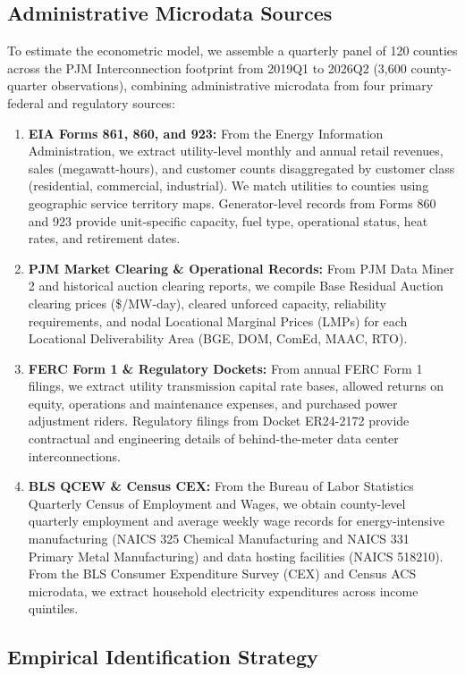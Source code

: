 \documentclass[11pt,a4paper]{article}
\begin{document}
\subsection{Administrative Microdata Sources}

To estimate the econometric model, we assemble a quarterly panel of 120 counties across the PJM Interconnection footprint from 2019Q1 to 2026Q2 (3,600 county-quarter observations), combining administrative microdata from four primary federal and regulatory sources:
\begin{enumerate}
    \item \textbf{EIA Forms 861, 860, and 923:} From the Energy Information Administration, we extract utility-level monthly and annual retail revenues, sales (megawatt-hours), and customer counts disaggregated by customer class (residential, commercial, industrial). We match utilities to counties using geographic service territory maps. Generator-level records from Forms 860 and 923 provide unit-specific capacity, fuel type, operational status, heat rates, and retirement dates.
    \item \textbf{PJM Market Clearing \& Operational Records:} From PJM Data Miner 2 and historical auction clearing reports, we compile Base Residual Auction clearing prices (\$/MW-day), cleared unforced capacity, reliability requirements, and nodal Locational Marginal Prices (LMPs) for each Locational Deliverability Area (BGE, DOM, ComEd, MAAC, RTO).
    \item \textbf{FERC Form 1 \& Regulatory Dockets:} From annual FERC Form 1 filings, we extract utility transmission capital rate bases, allowed returns on equity, operations and maintenance expenses, and purchased power adjustment riders. Regulatory filings from Docket ER24-2172 provide contractual and engineering details of behind-the-meter data center interconnections.
    \item \textbf{BLS QCEW \& Census CEX:} From the Bureau of Labor Statistics Quarterly Census of Employment and Wages, we obtain county-level quarterly employment and average weekly wage records for energy-intensive manufacturing (NAICS 325 Chemical Manufacturing and NAICS 331 Primary Metal Manufacturing) and data hosting facilities (NAICS 518210). From the BLS Consumer Expenditure Survey (CEX) and Census ACS microdata, we extract household electricity expenditures across income quintiles.
\end{enumerate}

\subsection{Empirical Identification Strategy}
\end{document}

